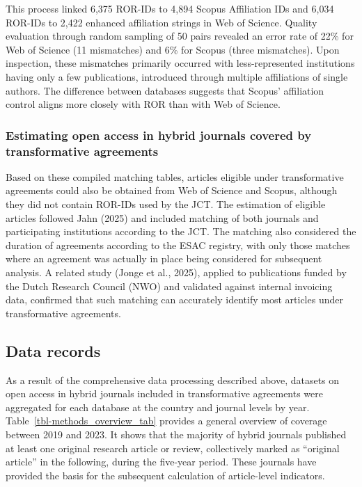 \documentclass[a4paper,man,floatsintext,longtable,noextraspace,10pt]{apa6}
\begin{document}
This process linked 6,375 ROR-IDs to 4,894 Scopus Affiliation IDs and
6,034 ROR-IDs to 2,422 enhanced affiliation strings in Web of Science.
Quality evaluation through random sampling of 50 pairs revealed an error
rate of 22\% for Web of Science (11 mismatches) and 6\% for Scopus
(three mismatches). Upon inspection, these mismatches primarily occurred
with less-represented institutions having only a few publications,
introduced through multiple affiliations of single authors. The
difference between databases suggests that Scopus' affiliation control
aligns more closely with ROR than with Web of Science.

\subsubsection{Estimating open access in hybrid journals covered by
transformative
agreements}\label{estimating-open-access-in-hybrid-journals-covered-by-transformative-agreements}

Based on these compiled matching tables, articles eligible under
transformative agreements could also be obtained from Web of Science and
Scopus, although they did not contain ROR-IDs used by the JCT. The
estimation of eligible articles followed Jahn (2025) and included
matching of both journals and participating institutions according to
the JCT. The matching also considered the duration of agreements
according to the ESAC registry, with only those matches where an
agreement was actually in place being considered for subsequent
analysis. A related study (Jonge et al., 2025), applied to publications
funded by the Dutch Research Council (NWO) and validated against
internal invoicing data, confirmed that such matching can accurately
identify most articles under transformative agreements.

\subsection{Data records}\label{data-records}

As a result of the comprehensive data processing described above,
datasets on open access in hybrid journals included in transformative
agreements were aggregated for each database at the country and journal
levels by year. Table~\ref{tbl-methods_overview_tab} provides a general
overview of coverage between 2019 and 2023. It shows that the majority
of hybrid journals published at least one original research article or
review, collectively marked as ``original article'' in the following,
during the five-year period. These journals have provided the basis for
the subsequent calculation of article-level indicators.
\end{document}
